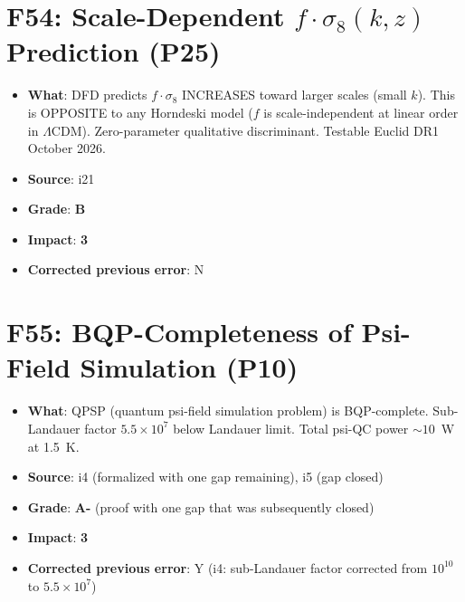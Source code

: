 \documentclass[11pt,a4paper]{article}
\newcommand{\grade}[1]{\textbf{#1}}
\newcommand{\impact}[1]{\textbf{#1}}
\begin{document}
\section{F54: Scale-Dependent $f \cdot \sigma_8(k,z)$ Prediction (P25)}
\begin{itemize}[nosep]
\item \textbf{What}: DFD predicts $f \cdot \sigma_8$ INCREASES toward larger scales (small $k$). This is OPPOSITE to any Horndeski model ($f$ is scale-independent at linear order in $\Lambda$CDM). Zero-parameter qualitative discriminant. Testable Euclid DR1 October 2026.
\item \textbf{Source}: i21
\item \textbf{Grade}: \grade{B}
\item \textbf{Impact}: \impact{3}
\item \textbf{Corrected previous error}: N
\end{itemize}

\section{F55: BQP-Completeness of Psi-Field Simulation (P10)}
\begin{itemize}[nosep]
\item \textbf{What}: QPSP (quantum psi-field simulation problem) is BQP-complete. Sub-Landauer factor $5.5 \times 10^7$ below Landauer limit. Total psi-QC power $\sim 10$~W at 1.5~K.
\item \textbf{Source}: i4 (formalized with one gap remaining), i5 (gap closed)
\item \textbf{Grade}: \grade{A-} (proof with one gap that was subsequently closed)
\item \textbf{Impact}: \impact{3}
\item \textbf{Corrected previous error}: Y (i4: sub-Landauer factor corrected from $10^{10}$ to $5.5 \times 10^7$)
\end{itemize}

\end{document}
